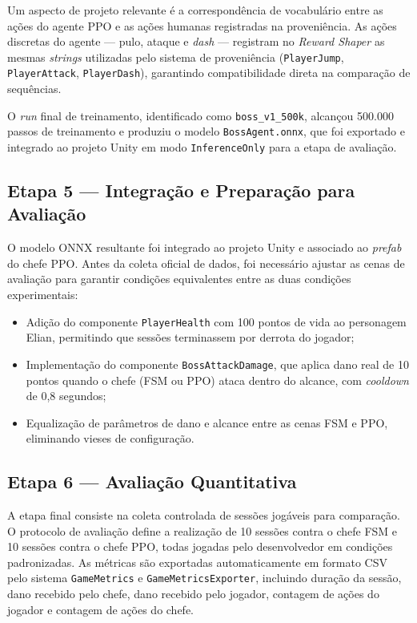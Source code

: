 Um aspecto de projeto relevante é a correspondência de vocabulário entre as
ações do agente PPO e as ações humanas registradas na proveniência. As ações
discretas do agente --- pulo, ataque e \textit{dash} --- registram no
\textit{Reward Shaper} as mesmas \textit{strings} utilizadas pelo sistema de
proveniência (\texttt{PlayerJump}, \texttt{PlayerAttack},
\texttt{PlayerDash}), garantindo compatibilidade direta na comparação de
sequências.

O \textit{run} final de treinamento, identificado como
\texttt{boss\_v1\_500k}, alcançou 500.000 passos de treinamento e produziu o
modelo \texttt{BossAgent.onnx}, que foi exportado e integrado ao projeto
Unity em modo \texttt{InferenceOnly} para a etapa de avaliação.

\subsection{Etapa 5 --- Integração e Preparação para Avaliação}
\label{subsec:etapa5}

O modelo ONNX resultante foi integrado ao projeto Unity e associado ao
\textit{prefab} do chefe PPO. Antes da coleta oficial de dados, foi
necessário ajustar as cenas de avaliação para garantir condições equivalentes
entre as duas condições experimentais:

\begin{itemize}
    \item Adição do componente \texttt{PlayerHealth} com 100 pontos de vida
          ao personagem Elian, permitindo que sessões terminassem por derrota
          do jogador;
    \item Implementação do componente \texttt{BossAttackDamage}, que aplica
          dano real de 10 pontos quando o chefe (FSM ou PPO) ataca dentro do
          alcance, com \textit{cooldown} de 0,8 segundos;
    \item Equalização de parâmetros de dano e alcance entre as cenas FSM e
          PPO, eliminando vieses de configuração.
\end{itemize}

\subsection{Etapa 6 --- Avaliação Quantitativa}
\label{subsec:etapa6}

A etapa final consiste na coleta controlada de sessões jogáveis para
comparação. O protocolo de avaliação define a realização de 10 sessões contra
o chefe FSM e 10 sessões contra o chefe PPO, todas jogadas pelo
desenvolvedor em condições padronizadas. As métricas são exportadas
automaticamente em formato CSV pelo sistema \texttt{GameMetrics} e
\texttt{GameMetricsExporter}, incluindo duração da sessão, dano recebido
pelo chefe, dano recebido pelo jogador, contagem de ações do jogador e
contagem de ações do chefe.

